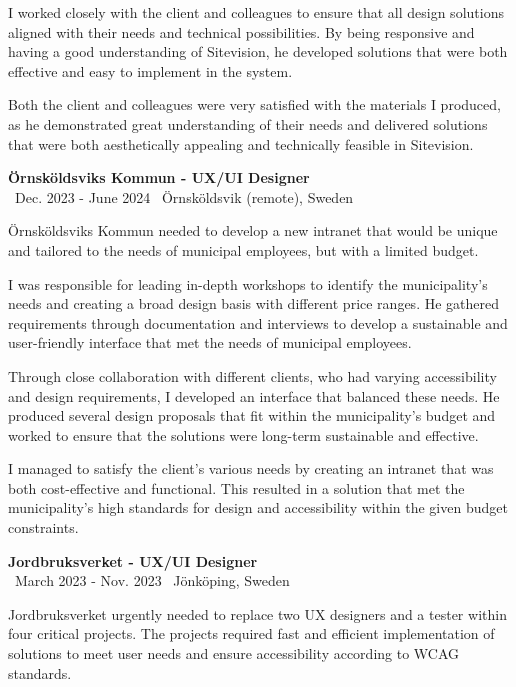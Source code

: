 \documentclass[a4paper,10pt]{article}
\begin{document}
I worked closely with the client and colleagues to ensure that all design solutions aligned with their needs and technical possibilities. By being responsive and having a good understanding of Sitevision, he developed solutions that were both effective and easy to implement in the system.

Both the client and colleagues were very satisfied with the materials I produced, as he demonstrated great understanding of their needs and delivered solutions that were both aesthetically appealing and technically feasible in Sitevision.

\vspace{0.5cm}
\textbf{Örnsköldsviks Kommun - UX/UI Designer}\\
\normalsize \faCalendar \ Dec. 2023 - June 2024 \quad \faMapMarker \ Örnsköldsvik (remote), Sweden

Örnsköldsviks Kommun needed to develop a new intranet that would be unique and tailored to the needs of municipal employees, but with a limited budget.

I was responsible for leading in-depth workshops to identify the municipality's needs and creating a broad design basis with different price ranges. He gathered requirements through documentation and interviews to develop a sustainable and user-friendly interface that met the needs of municipal employees.

Through close collaboration with different clients, who had varying accessibility and design requirements, I developed an interface that balanced these needs. He produced several design proposals that fit within the municipality's budget and worked to ensure that the solutions were long-term sustainable and effective.

I managed to satisfy the client's various needs by creating an intranet that was both cost-effective and functional. This resulted in a solution that met the municipality's high standards for design and accessibility within the given budget constraints.

\vspace{0.5cm}
\textbf{Jordbruksverket - UX/UI Designer}\\
\normalsize \faCalendar \ March 2023 - Nov. 2023 \quad \faMapMarker \ Jönköping, Sweden

Jordbruksverket urgently needed to replace two UX designers and a tester within four critical projects. The projects required fast and efficient implementation of solutions to meet user needs and ensure accessibility according to WCAG standards.
\end{document}
